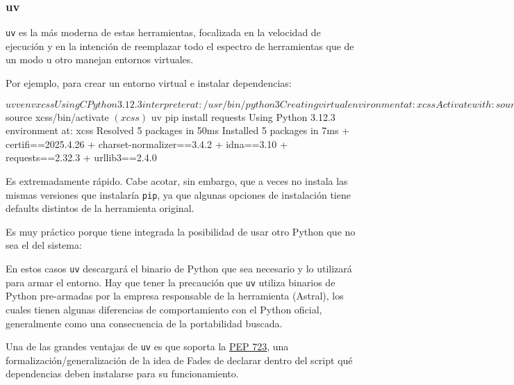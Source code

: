 \subsubsection{uv}

\texttt{uv} es la más moderna de estas herramientas, focalizada en la velocidad de ejecución y en la intención de reemplazar todo el espectro de herramientas que de un modo u otro manejan entornos virtuales.

Por ejemplo, para crear un entorno virtual e instalar dependencias:

\begin{shell}
    $ uv venv xcss
    Using CPython 3.12.3 interpreter at: /usr/bin/python3
    Creating virtual environment at: xcss
    Activate with: source xcss/bin/activate
    $ source xcss/bin/activate
    $ (xcss) $ uv pip install requests
    Using Python 3.12.3 environment at: xcss
    Resolved 5 packages in 50ms
    Installed 5 packages in 7ms
     + certifi==2025.4.26
     + charset-normalizer==3.4.2
     + idna==3.10
     + requests==2.32.3
     + urllib3==2.4.0
\end{shell}

Es extremadamente rápido. Cabe acotar, sin embargo, que a veces no instala las mismas versiones que instalaría \texttt{pip}, ya que algunas opciones de instalación tiene defaults distintos de la herramienta original.

Es muy práctico porque tiene integrada la posibilidad de usar otro Python que no sea el del sistema:


En estos casos \texttt{uv} descargará el binario de Python que sea necesario y lo utilizará para armar el entorno. Hay que tener la precaución que \texttt{uv} utiliza binarios de Python pre-armadas por la empresa responsable de la herramienta (Astral), los cuales tienen algunas diferencias de comportamiento con el Python oficial, generalmente como una consecuencia de la portabilidad buscada.

Una de las grandes ventajas de \texttt{uv} es que soporta la \href{https://peps.python.org/pep-0723/}{PEP 723}, una formalización/generalización de la idea de Fades de declarar dentro del script qué dependencias deben instalarse para su funcionamiento.

